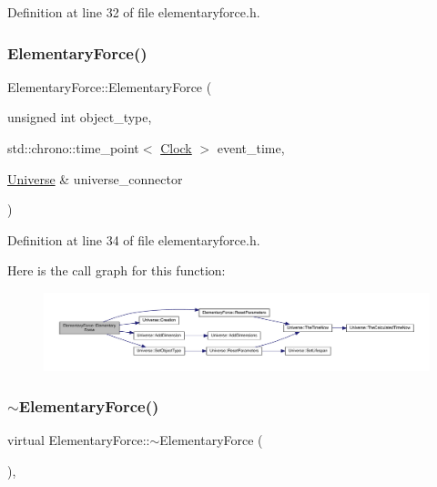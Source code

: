 Definition at line 32 of file elementaryforce.\+h.

\mbox{\label{class_elementary_force_a1b466cc9aeb317161a7632cb5651a537}} 
\subsubsection{\texorpdfstring{Elementary\+Force()}{ElementaryForce()}\hspace{0.1cm}{\footnotesize\ttfamily [4/4]}}
{\footnotesize\ttfamily Elementary\+Force\+::\+Elementary\+Force (\begin{DoxyParamCaption}\item[{unsigned int}]{object\+\_\+type,  }\item[{std\+::chrono\+::time\+\_\+point$<$ \mbox{\hyperlink{universe_8h_a0ef8d951d1ca5ab3cfaf7ab4c7a6fd80}{Clock}} $>$}]{event\+\_\+time,  }\item[{\mbox{\hyperlink{class_universe}{Universe}} \&}]{universe\+\_\+connector }\end{DoxyParamCaption})\hspace{0.3cm}{\ttfamily [inline]}}



Definition at line 34 of file elementaryforce.\+h.

Here is the call graph for this function\+:\nopagebreak
\begin{figure}[H]
\begin{center}
\leavevmode
\includegraphics[width=350pt]{class_elementary_force_a1b466cc9aeb317161a7632cb5651a537_cgraph}
\end{center}
\end{figure}
\mbox{\label{class_elementary_force_afee0c87be3bd2a5221c9fcaddd70dfa6}} 
\subsubsection{\texorpdfstring{$\sim$\+Elementary\+Force()}{~ElementaryForce()}}
{\footnotesize\ttfamily virtual Elementary\+Force\+::$\sim$\+Elementary\+Force (\begin{DoxyParamCaption}{ }\end{DoxyParamCaption})\hspace{0.3cm}{\ttfamily [inline]}, {\ttfamily [virtual]}}

